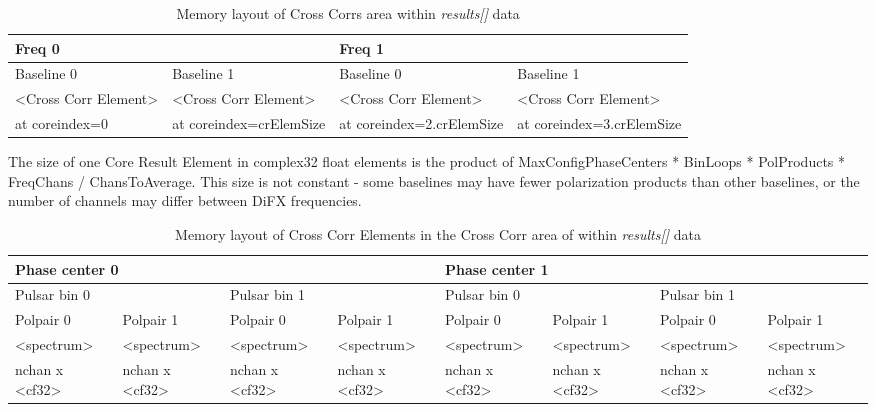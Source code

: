 \begin{table}[!htp]
\caption{Memory layout of Cross Corrs area within {\em results[]} data \label{tab:A.coreresults.crosscorrs}}
\begin{tabular}{|l|l|l|l|}
\hline
\multicolumn{2}{|l|}{Freq 0} & \multicolumn{2}{l|}{Freq 1} \\
\hline
Baseline 0 & Baseline 1 & Baseline 0 & Baseline 1 \\
\hline
\small{\textless{}Cross Corr Element\textgreater} & \small{\textless{}Cross Corr Element\textgreater} &
\small{\textless{}Cross Corr Element\textgreater} & \small{\textless{}Cross Corr Element\textgreater} \\
\small{at coreindex=0} & \small{at coreindex=crElemSize} & \small{at coreindex=2.crElemSize} & \small{at coreindex=3.crElemSize} \\
\hline
\end{tabular}
\end{table}

The size of one Core Result Element in complex32 float elements is the product of MaxConfigPhaseCenters * BinLoops * PolProducts * FreqChans / ChansToAverage.
This size is not constant - some baselines may have fewer polarization products than other baselines, or the number of  channels may differ between DiFX frequencies.

\begin{table}[!htp]
\caption{Memory layout of  Cross Corr Elements in the Cross Corr area of within {\em results[]} data \label{tab:A.coreresults.crosscorrselement}}
\begin{tabular}{|l|l|l|l|l|l|l|l|}
\hline
\multicolumn{4}{|l|}{Phase center 0} & \multicolumn{4}{l|}{Phase center 1} \\
\hline
\multicolumn{2}{|l|}{Pulsar bin 0} & \multicolumn{2}{l|}{Pulsar bin 1} & \multicolumn{2}{l|}{Pulsar bin 0} & \multicolumn{2}{l|}{Pulsar bin 1} \\
\hline
\small{Polpair 0} & \small{Polpair 1} & 
\small{Polpair 0} & \small{Polpair 1} & 
\small{Polpair 0} & \small{Polpair 1} & 
\small{Polpair 0} & \small{Polpair 1} \\
\hline
\small{\textless{}spectrum\textgreater} & \small{\textless{}spectrum\textgreater} &
\small{\textless{}spectrum\textgreater} & \small{\textless{}spectrum\textgreater} &
\small{\textless{}spectrum\textgreater} & \small{\textless{}spectrum\textgreater} &
\small{\textless{}spectrum\textgreater} & \small{\textless{}spectrum\textgreater} \\
\hline
\tiny{nchan x \textless{}cf32\textgreater{}} & \tiny{nchan x \textless{}cf32\textgreater{}} & 
\tiny{nchan x \textless{}cf32\textgreater{}} & \tiny{nchan x \textless{}cf32\textgreater{}} & 
\tiny{nchan x \textless{}cf32\textgreater{}} & \tiny{nchan x \textless{}cf32\textgreater{}} & 
\tiny{nchan x \textless{}cf32\textgreater{}} & \tiny{nchan x \textless{}cf32\textgreater{}} \\
\hline
\end{tabular}
\end{table}

